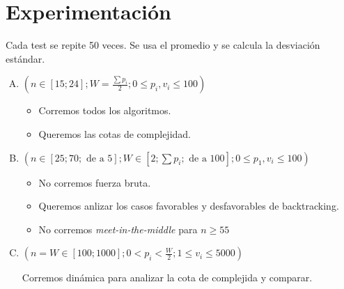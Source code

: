 \documentclass[fleqn, 11pt]{article}
\begin{document}
\section{Experimentación}

Cada test se repite 50 veces. Se usa el promedio y se calcula la desviación
estándar.

\begin{enumerate}[A.]
\item $(n \in [15; 24];
	W=\frac{\sum p_i}{2};
	0 \leq p_i, v_i \leq 100)$

\begin{itemize}
\item Corremos todos los algoritmos.
\item Queremos las cotas de complejidad.
\end{itemize}

\item $(n \in [25; 70; \text{ de a } 5];
	W \in [2; \sum p_i; \text{ de a } 100];
	0 \leq p_1, v_i \leq 100)$

\begin{itemize}
\item No corremos fuerza bruta.
\item Queremos anlizar los casos favorables y desfavorables de backtracking.
\item No corremos \emph{meet-in-the-middle} para $n \geq 55$
\end{itemize}

\item $(n = W \in [100; 1000];
        0 < p_i < \frac{W}{2};
        1 \leq v_i \leq 5000)$

Corremos dinámica para analizar la cota de complejida y comparar.
\end{enumerate}
\end{document}
